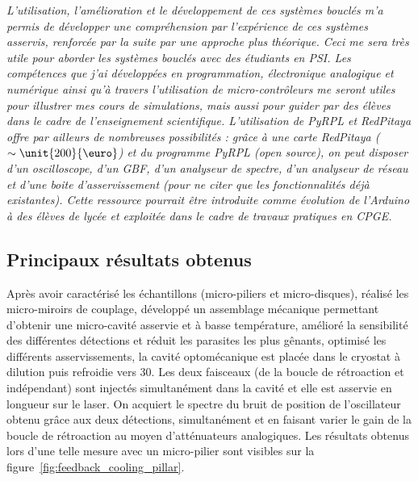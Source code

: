 \documentclass[12pt,a4paper]{article}
\begin{document}
\textit{L'utilisation, l'amélioration et le développement de ces systèmes bouclés m'a permis de développer une compréhension par l'expérience de ces systèmes asservis, renforcée par la suite par une approche plus théorique.
Ceci me sera très utile pour aborder les systèmes bouclés avec des étudiants en PSI.
Les compétences que j'ai développées en programmation, électronique analogique et numérique ainsi qu'à travers l'utilisation de micro-contrôleurs me seront utiles pour illustrer mes cours de simulations, mais aussi pour guider par des élèves dans le cadre de l'enseignement scientifique.
L'utilisation de PyRPL et RedPitaya offre par ailleurs de nombreuses possibilités : grâce à une carte RedPitaya ($\sim\unit{200}{\text{\euro}}$) et du programme PyRPL (open source), on peut disposer d'un oscilloscope, d'un GBF, d'un analyseur de spectre, d'un analyseur de réseau et d'une boite d'asservissement (pour ne citer que les fonctionnalités déjà existantes).
Cette ressource pourrait être introduite comme évolution de l'Arduino à des élèves de lycée et exploitée dans le cadre de travaux pratiques en CPGE.}

\subsection{Principaux résultats obtenus}

Après avoir caractérisé les échantillons (micro-piliers et micro-disques), réalisé les micro-miroirs de couplage, développé un assemblage mécanique permettant d'obtenir une micro-cavité asservie et à basse température, amélioré la sensibilité des différentes détections et réduit les parasites les plus gênants, optimisé les différents asservissements, la cavité optomécanique est placée dans le cryostat à dilution puis refroidie vers \unit{30}{\milli\kelvin}.
Les deux faisceaux (de la boucle de rétroaction et indépendant) sont injectés simultanément dans la cavité et elle est asservie en longueur sur le laser.
On acquiert le spectre du bruit de position de l'oscillateur obtenu grâce aux deux détections, simultanément et en faisant varier le gain de la boucle de rétroaction au moyen d'atténuateurs analogiques.
Les résultats obtenus lors d'une telle mesure avec un micro-pilier sont visibles sur la figure~\ref{fig:feedback_cooling_pillar}.
\end{document}
